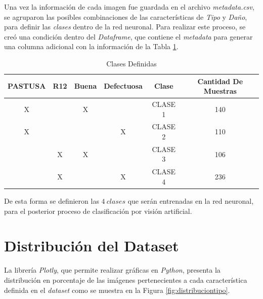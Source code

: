 Una vez la información de cada imagen fue guardada en el archivo \textit{metadata.csv}, se agruparon las posibles combinaciones de las características de \textit{Tipo} y \textit{Daño}, para definir las \textit{clases} dentro de la red neuronal. Para realizar este proceso, se creó una condición dentro del \textit{Dataframe}, que contiene el \textit{metadata} para generar una columna adicional con la información de la Tabla \ref{table:Clases}.\\	

\begin{table}[ht]
	\centering
	\begin{tabular}{|c|c|c|c|c|c|}
		\hline
		PASTUSA & R12 & Buena & Defectuosa & Clase & Cantidad De Muestras\\
		\hline
		X &  & X &  & CLASE 1 & 140\\
		\hline
		X &  &  & X & CLASE 2 & 110\\
		\hline
		& X & X &  & CLASE 3 & 106\\
		\hline
		& X &  & X & CLASE 4 & 236\\
		\hline
	\end{tabular}	
	\caption{Clases Definidas}
	\label{table:Clases}
\end{table}	

De esta forma se definieron las $4 \ clases$ que serán entrenadas en la red neuronal, para el posterior proceso de clasificación por visión artificial. 


\newpage
\section{Distribución del Dataset}

La librería \textit{Plotly}, que permite realizar gráficas en \textit{Python}, presenta la distribución en porcentaje de las imágenes pertenecientes a cada característica definida en el \textit{dataset} como se muestra en la Figura \ref{fig:distribuciontipo}.\\

